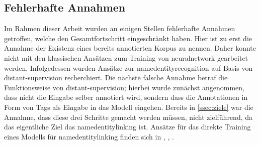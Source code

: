 \subsection{Fehlerhafte Annahmen}
Im Rahmen dieser Arbeit wurden an einigen Stellen fehlerhafte Annahmen getroffen,
welche den Gesamtfortschritt eingeschränkt haben.
Hier ist zu erst die Annahme der Existenz eines bereits annotierten Korpus zu nennen.
Daher konnte nicht mit den klassischen Ansätzen zum Training von \gls{neuralnetwork} gearbeitet werden.
Infolgedessen wurden Ansätze zur \gls{namedentityrecognition} auf Basis von \gls{distant-supervision}
recherchiert.
Die nächste falsche Annahme betraf die Funktionsweise von \gls{distant-supervision};
hierbei wurde zunächst angenommen,
dass nicht die Eingabe selber
annotiert wird,
sondern dass die Annotationen in Form von Tags als Eingabe in das Modell eingehen.
Bereits in \cref{ssec:ziele} war die Annahme,
dass diese drei Schritte gemacht werden müssen,
nicht zielführend,
da das eigentliche Ziel das \gls{namedentitylinking} ist.
Ansätze für das direkte Training eines Modells für \gls{namedentitylinking}
finden sich in \autocite{1911.03834}, \autocite{Raheim2022}, \autocite{K19-1063}.
